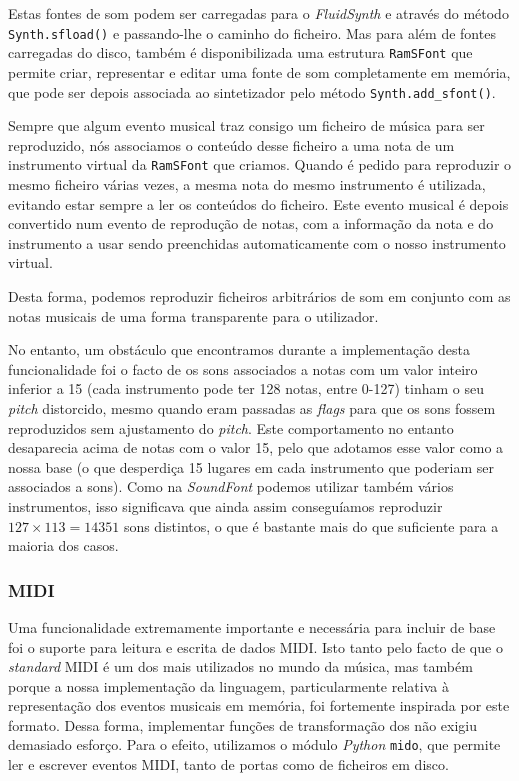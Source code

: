 Estas fontes de som podem ser carregadas para o \textit{FluidSynth} e através do método \texttt{Synth.sfload()} e passando-lhe o caminho do ficheiro. Mas para além de fontes carregadas do disco, também é disponibilizada uma estrutura \texttt{RamSFont} que permite criar, representar e editar uma fonte de som completamente em memória, que pode ser depois associada ao sintetizador pelo método \texttt{Synth.add\_sfont()}.

Sempre que algum evento musical traz consigo um ficheiro de música para ser reproduzido, nós associamos o conteúdo desse ficheiro a uma nota de um instrumento virtual da \texttt{RamSFont} que criamos. Quando é pedido para reproduzir o mesmo ficheiro várias vezes, a mesma nota do mesmo instrumento é utilizada, evitando estar sempre a ler os conteúdos do ficheiro. Este evento musical é depois convertido num evento de reprodução de notas, com a informação da nota e do instrumento a usar sendo preenchidas automaticamente com o nosso instrumento virtual.

Desta forma, podemos reproduzir ficheiros arbitrários de som em conjunto com as notas musicais de uma forma transparente para o utilizador.

No entanto, um obstáculo que encontramos durante a implementação desta funcionalidade foi o facto de os sons associados a notas com um valor inteiro inferior a 15 (cada instrumento pode ter 128 notas, entre 0-127) tinham o seu \textit{pitch} distorcido, mesmo quando eram passadas as \textit{flags} para que os sons fossem reproduzidos sem ajustamento do \textit{pitch}. Este comportamento no entanto desaparecia acima de notas com o valor 15, pelo que adotamos esse valor como a nossa base (o que desperdiça 15 lugares em cada instrumento que poderiam ser associados a sons). Como na \textit{SoundFont} podemos utilizar também vários instrumentos, isso significava que ainda assim conseguíamos reproduzir $127 \times 113 = 14351$ sons distintos, o que é bastante mais do que suficiente para a maioria dos casos.

\subsubsection{MIDI}
Uma funcionalidade extremamente importante e necessária para incluir de base foi o suporte para leitura e escrita de dados MIDI. Isto tanto pelo facto de que o \textit{standard} MIDI é um dos mais utilizados no mundo da música, mas também porque a nossa implementação da linguagem, particularmente relativa à representação dos eventos musicais em memória, foi fortemente inspirada por este formato. Dessa forma, implementar funções de transformação dos não exigiu demasiado esforço. Para o efeito, utilizamos o módulo \textit{Python} \texttt{mido}, que permite ler e escrever eventos MIDI, tanto de portas como de ficheiros em disco.

